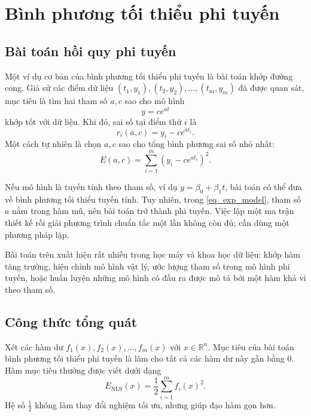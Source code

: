 
\section{Bình phương tối thiểu phi tuyến}
\label{SEC_binh_phuong_toi_thieu_phi_tuyen}

\subsection{Bài toán hồi quy phi tuyến}
\label{SUB_SEC_bai_toan_hoi_quy_phi_tuyen}
Một ví dụ cơ bản của bình phương tối thiểu phi tuyến là bài toán khớp đường cong. Giả sử các điểm dữ liệu $(t_1,y_1),(t_2,y_2),\dots,(t_m,y_m)$ đã được quan sát, mục tiêu là tìm hai tham số $a,c$ sao cho mô hình
\begin{equation}
    y = c e^{at}
    \label{eq_exp_model}
\end{equation}
khớp tốt với dữ liệu. Khi đó, sai số tại điểm thứ $i$ là
\begin{equation}
    r_i(a,c)=y_i-ce^{at_i}.
    \label{eq_exp_residual}
\end{equation}
Một cách tự nhiên là chọn $a,c$ sao cho tổng bình phương sai số nhỏ nhất:
\begin{equation}
    E(a,c)=\sum_{i=1}^{m}\left(y_i-ce^{at_i}\right)^2.
    \label{eq_exp_nls}
\end{equation}
\medskip

Nếu mô hình là tuyến tính theo tham số, ví dụ $y=\beta_0+\beta_1t$, bài toán có thể đưa về bình phương tối thiểu tuyến tính. Tuy nhiên, trong \eqref{eq_exp_model}, tham số $a$ nằm trong hàm mũ, nên bài toán trở thành phi tuyến. Việc lập một ma trận thiết kế rồi giải phương trình chuẩn tắc một lần không còn đủ; cần dùng một phương pháp lặp.
\medskip

Bài toán trên xuất hiện rất nhiều trong học máy và khoa học dữ liệu: khớp hàm tăng trưởng, hiệu chỉnh mô hình vật lý, ước lượng tham số trong mô hình phi tuyến, hoặc huấn luyện những mô hình có đầu ra được mô tả bởi một hàm khả vi theo tham số.

\subsection{Công thức tổng quát}
\label{SUB_SEC_cong_thuc_tong_quat_nls}
Xét các hàm dư $f_1(x), f_2(x), \dots, f_m(x)$ với $x\in\mathbb{R}^{n}$. Mục tiêu của bài toán bình phương tối thiểu phi tuyến là làm cho tất cả các hàm dư này gần bằng $0$. Hàm mục tiêu thường được viết dưới dạng
\begin{equation}
    E_{\mathrm{NLS}}(x)
    =\frac{1}{2}\sum_{i=1}^{m} f_i(x)^2.
    \label{eq_enls_general}
\end{equation}
Hệ số $\frac{1}{2}$ không làm thay đổi nghiệm tối ưu, nhưng giúp đạo hàm gọn hơn.
\medskip

